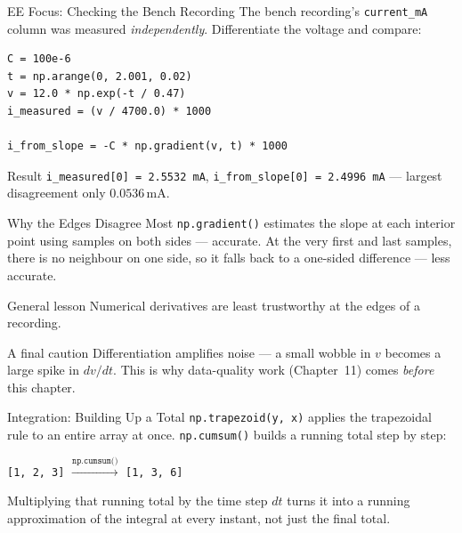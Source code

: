\documentclass[9pt,aspectratio=169,xcolor=table]{beamer}
\begin{document}
\begin{frame}[fragile]{EE Focus: Checking the Bench Recording}
    \leavevmode
    \small
    The bench recording's \texttt{current\_mA} column was measured
    \emph{independently}. Differentiate the voltage and compare:

\begin{lstlisting}
C = 100e-6
t = np.arange(0, 2.001, 0.02)
v = 12.0 * np.exp(-t / 0.47)
i_measured = (v / 4700.0) * 1000

i_from_slope = -C * np.gradient(v, t) * 1000
\end{lstlisting}

    \begin{alertblock}{Result}
        \texttt{i\_measured[0] = 2.5532 mA}, \texttt{i\_from\_slope[0]
        = 2.4996 mA} --- largest disagreement only $0.0536\,\text{mA}$.
    \end{alertblock}
\end{frame}

\begin{frame}{Why the Edges Disagree Most}
    \leavevmode
    \texttt{np.gradient()} estimates the slope at each interior point
    using samples on \alert{both} sides --- accurate. At the very first
    and last samples, there is no neighbour on one side, so it falls
    back to a one-sided difference --- less accurate.

    \vspace{3mm}
    \begin{block}{General lesson}
        Numerical derivatives are least trustworthy at the
        \alert{edges} of a recording.
    \end{block}

    \vspace{3mm}
    \begin{alertblock}{A final caution}
        Differentiation \alert{amplifies} noise --- a small wobble in
        $v$ becomes a large spike in $dv/dt$. This is why data-quality
        work (Chapter~11) comes \emph{before} this chapter.
    \end{alertblock}
\end{frame}

\begin{frame}{Integration: Building Up a Total}
    \leavevmode
    \small
    \texttt{np.trapezoid(y, x)} applies the trapezoidal rule to an
    entire array at once. \texttt{np.cumsum()} builds a \alert{running
    total} step by step:

    \vspace{2mm}
    \begin{center}
    \texttt{[1, 2, 3]} $\xrightarrow{\texttt{np.cumsum()}}$ \texttt{[1,
    3, 6]}
    \end{center}

    \vspace{3mm}
    Multiplying that running total by the time step $dt$ turns it into
    a running approximation of the integral at \alert{every instant},
    not just the final total.
\end{frame}
\end{document}
